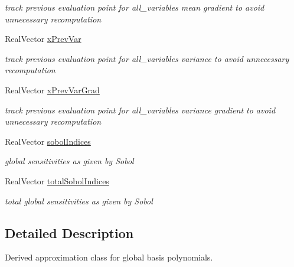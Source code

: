 \begin{DoxyCompactItemize}
\begin{DoxyCompactList}\small\item\em track previous evaluation point for all\+\_\+variables mean gradient to avoid unnecessary recomputation \end{DoxyCompactList}\item 
Real\+Vector \hyperlink{classPecos_1_1PolynomialApproximation_af7635a6a3a22c2efbaa61a43f5893c1b}{x\+Prev\+Var}\label{classPecos_1_1PolynomialApproximation_af7635a6a3a22c2efbaa61a43f5893c1b}

\begin{DoxyCompactList}\small\item\em track previous evaluation point for all\+\_\+variables variance to avoid unnecessary recomputation \end{DoxyCompactList}\item 
Real\+Vector \hyperlink{classPecos_1_1PolynomialApproximation_a1707b68e85ab387644504746cde5b37b}{x\+Prev\+Var\+Grad}\label{classPecos_1_1PolynomialApproximation_a1707b68e85ab387644504746cde5b37b}

\begin{DoxyCompactList}\small\item\em track previous evaluation point for all\+\_\+variables variance gradient to avoid unnecessary recomputation \end{DoxyCompactList}\item 
Real\+Vector \hyperlink{classPecos_1_1PolynomialApproximation_ae701faa5aed8807339593e9e622b3f10}{sobol\+Indices}\label{classPecos_1_1PolynomialApproximation_ae701faa5aed8807339593e9e622b3f10}

\begin{DoxyCompactList}\small\item\em global sensitivities as given by Sobol\textquotesingle{} \end{DoxyCompactList}\item 
Real\+Vector \hyperlink{classPecos_1_1PolynomialApproximation_a215e3586a19726f01e446e950eeece65}{total\+Sobol\+Indices}\label{classPecos_1_1PolynomialApproximation_a215e3586a19726f01e446e950eeece65}

\begin{DoxyCompactList}\small\item\em total global sensitivities as given by Sobol\textquotesingle{} \end{DoxyCompactList}\end{DoxyCompactItemize}


\subsection{Detailed Description}
Derived approximation class for global basis polynomials. 

